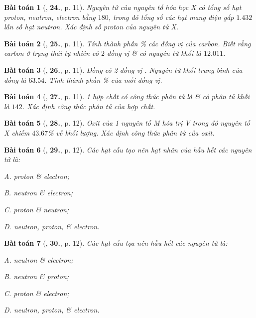 \documentclass{article}
\numberwithin{equation}{section}
\newtheorem{baitoan}{Bài toán}[section]
\begin{document}
\begin{baitoan}[\cite{An2011}, \textbf{24.}, p. 11]
	Nguyên tử của nguyên tố hóa học X có tổng số hạt proton, neutron, electron bằng $180$, trong đó tổng số các hạt mang điện gấp $1.432$ lần số hạt neutron. Xác định số proton của nguyên tử X.
\end{baitoan}

\begin{baitoan}[\cite{An2011}, \textbf{25.}, p. 11]
	Tính thành phần \% các đồng vị của carbon. Biết rằng carbon ở trạng thái tự nhiên có $2$ đồng vị  \&  có nguyên tử khối là $12.011$.
\end{baitoan}

\begin{baitoan}[\cite{An2011}, \textbf{26.}, p. 11]
	Đồng có 2 đồng vị . Nguyên tử khối trung bình của đồng là $63.54$. Tính thành phần \% của mỗi đồng vị.
\end{baitoan}

\begin{baitoan}[\cite{An2011}, \textbf{27.}, p. 11]
	1 hợp chất có công thức phân tử là  \& có phân tử khối là $142$. Xác định công thức phân tử của hợp chất.
\end{baitoan}

\begin{baitoan}[\cite{An2011}, \textbf{28.}, p. 12]
	Oxit của 1 nguyên tố M hóa trị V trong đó nguyên tố X chiếm $43.67$\% về khối lượng. Xác định công thức phân tử của oxit.
\end{baitoan}

\begin{baitoan}[\cite{An2011}, \textbf{29.}, p. 12]
	Các hạt cấu tạo nên hạt nhân của hầu hết các nguyên tử là:
	\begin{enumerate*}
		\item[{\rm\sf A.}] proton \& electron;
		\item[{\rm\sf B.}] neutron \& electron;
		\item[{\rm\sf C.}] proton \& neutron;
		\item[{\rm\sf D.}] neutron, proton, \& electron.
	\end{enumerate*}
\end{baitoan}

\begin{baitoan}[\cite{An2011}, \textbf{30.}, p. 12]
	Các hạt cấu tọa nên hầu hết các nguyên tử là:
	\begin{enumerate*}
		\item[{\rm\sf A.}] neutron \& electron;
		\item[{\rm\sf B.}] neutron \& proton;
		\item[{\rm\sf C.}] proton \& electron;
		\item[{\rm\sf D.}] neutron, proton, \& electron.
	\end{enumerate*}
\end{baitoan}
\end{document}

